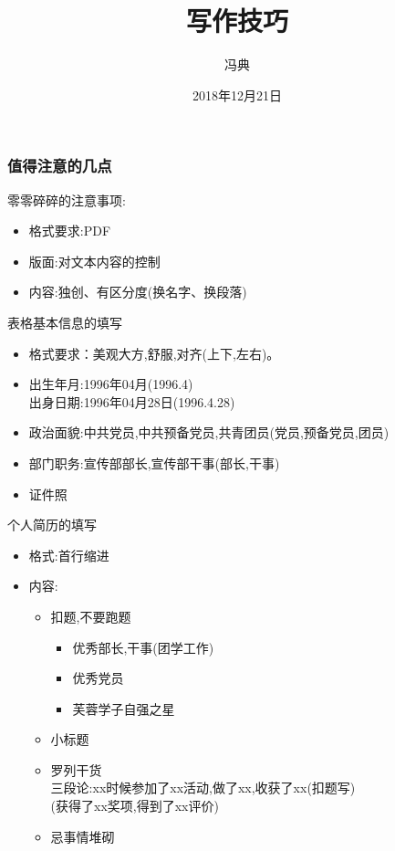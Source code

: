 \documentclass{beamer}
\title{写作技巧}
\author{冯典}
\institute{湘潭大学\\数学与计算科学学院}
\date{2018年12月21日}
\begin{document}
 
\frame{\titlepage}
 
\begin{frame}
\frametitle{值得注意的几点}
 零零碎碎的注意事项: 
\begin{itemize}
	\item
	格式要求:PDF
	\item
	版面:对文本内容的控制
	\item
	内容:独创、有区分度(换名字、换段落)
	
	
\end{itemize}
\end{frame}

\begin{frame}{表格基本信息的填写}

\begin{itemize}
	\item
	格式要求：美观大方,舒服,对齐(上下,左右)。
	\item
	出生年月:1996年04月(1996.4)\\
	出身日期:1996年04月28日(1996.4.28)\\
	\item
	政治面貌:中共党员,中共预备党员,共青团员(党员,预备党员,团员)
	\item
	部门职务:宣传部部长,宣传部干事(部长,干事)
	\item
	证件照	
\end{itemize}

\end{frame}
 
 
 \begin{frame}{个人简历的填写}
   \begin{itemize}
   	\item
   	格式:首行缩进
   	\item
   	内容:
   	    \begin{itemize}
   	    	\item 
   	    	扣题,不要跑题
   	    	\begin{itemize}
   	    		\item 
   	    		优秀部长,干事(团学工作)
   	    		\item
   	    		优秀党员
   	    		\item
   	    		芙蓉学子自强之星
   	    	\end{itemize}
       	    \item
       	    小标题
   	    	\item
   	    	罗列干货\\
   	    	三段论:xx时候参加了xx活动,做了xx,收获了xx(扣题写)\\
   	    	\quad \qquad (获得了xx奖项,得到了xx评价)
   	    	\item
   	    	忌事情堆砌
   	    	
   	    \end{itemize}
   \end{itemize}
\end{frame}
\end{document}
